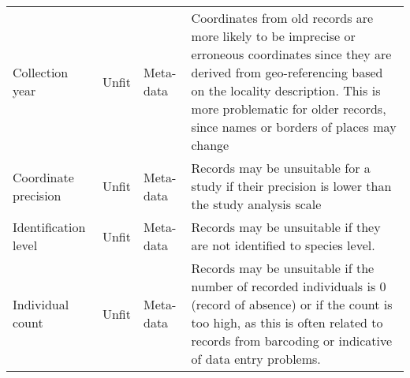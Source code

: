 \documentclass[fleqn,10pt,lineno]{wlpeerj} %
\begin{document}
\begin{table}[!h]
\begin{tabular}[t]{>{\raggedright\arraybackslash}p{2cm}>{\raggedright\arraybackslash}p{1cm}>{\raggedright\arraybackslash}p{2.5cm}>{\raggedright\arraybackslash}p{9cm}}
Collection year & Unfit & Meta-data & Coordinates from old records are more likely to be imprecise or erroneous coordinates since they are derived from  geo-referencing based on the locality description. This is more problematic for older records, since names or borders of places may change\\
\addlinespace
\rowcolor{gray!6}  Coordinate precision & Unfit & Meta-data & Records may be unsuitable for a study if their precision is lower than the study analysis scale\\
Identification level & Unfit & Meta-data & Records may be unsuitable if they are not identified to species level.\\
\rowcolor{gray!6}  Individual count & Unfit & Meta-data & Records may be unsuitable if the number of recorded individuals is 0 (record of absence) or if the count is too high, as this is often related to records from barcoding or indicative of data entry problems.\\
\bottomrule
\end{tabular}
\end{table}
\end{document}
